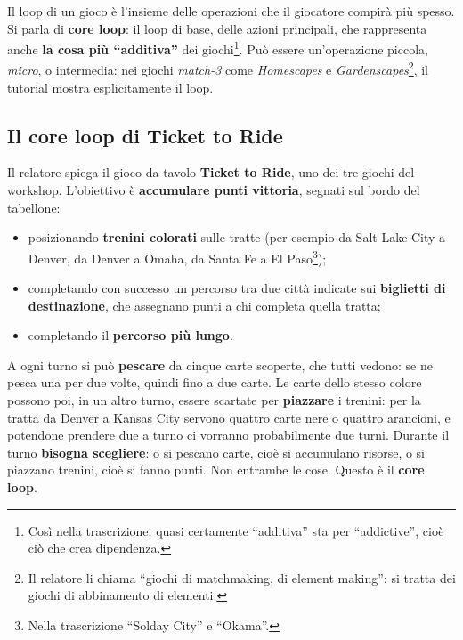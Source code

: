 Il loop di un gioco è l'insieme delle operazioni che il giocatore compirà più
spesso. Si parla di \textbf{core loop}: il loop di base, delle azioni principali,
che rappresenta anche \textbf{la cosa più ``additiva''} dei
giochi\footnote{Così nella trascrizione; quasi certamente ``additiva'' sta per
``addictive'', cioè ciò che crea dipendenza.}. Può essere un'operazione piccola,
\emph{micro}, o intermedia: nei giochi \emph{match-3} come \emph{Homescapes} e
\emph{Gardenscapes}\footnote{Il relatore li chiama ``giochi di matchmaking, di
element making'': si tratta dei giochi di abbinamento di elementi.}, il tutorial
mostra esplicitamente il loop.

\subsection{Il core loop di Ticket to Ride}
\label{subsec:z6-ticket-to-ride}

Il relatore spiega il gioco da tavolo \textbf{Ticket to Ride}, uno dei tre giochi
del workshop. L'obiettivo è \textbf{accumulare punti vittoria}, segnati sul
bordo del tabellone:
\begin{itemize}
  \item posizionando \textbf{trenini colorati} sulle tratte (per esempio da Salt
        Lake City a Denver, da Denver a Omaha, da Santa Fe a El
        Paso\footnote{Nella trascrizione ``Solday City'' e ``Okama''.});
  \item completando con successo un percorso tra due città indicate sui
        \textbf{biglietti di destinazione}, che assegnano punti a chi completa
        quella tratta;
  \item completando il \textbf{percorso più lungo}.
\end{itemize}
A ogni turno si può \textbf{pescare} da cinque carte scoperte, che tutti vedono:
se ne pesca una per due volte, quindi fino a due carte. Le carte dello stesso
colore possono poi, in un altro turno, essere scartate per \textbf{piazzare} i
trenini: per la tratta da Denver a Kansas City servono quattro carte nere o
quattro arancioni, e potendone prendere due a turno ci vorranno probabilmente due
turni. Durante il turno \textbf{bisogna scegliere}: o si pescano carte, cioè si
accumulano risorse, o si piazzano trenini, cioè si fanno punti. Non entrambe le
cose. Questo è il \textbf{core loop}.

